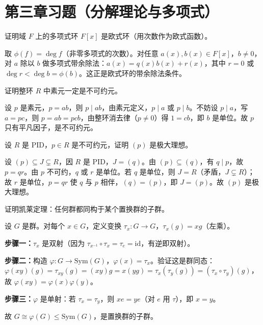 \section{第三章习题（分解理论与多项式）}

\begin{homework}
证明域 $F$ 上的多项式环 $F[x]$ 是欧式环（用次数作为欧式函数）。

\begin{solution}
取 $\phi(f) = \deg f$（非零多项式的次数）。对任意 $a(x), b(x) \in F[x]$，$b \ne 0$，对 $a$ 除以 $b$ 做多项式带余除法：$a(x) = q(x)b(x) + r(x)$，其中 $r = 0$ 或 $\deg r < \deg b = \phi(b)$。这正是欧式环的带余除法条件。
\end{solution}
\end{homework}

\begin{homework}
证明整环 $R$ 中素元一定是不可约元。

\begin{solution}
设 $p$ 是素元，$p = ab$，则 $p \mid ab$，由素元定义，$p \mid a$ 或 $p \mid b$。不妨设 $p \mid a$，写 $a = pc$，则 $p = ab = pcb$，由整环消去律（$p \ne 0$）得 $1 = cb$，即 $b$ 是单位。故 $p$ 只有平凡因子，是不可约元。
\end{solution}
\end{homework}

\begin{homework}
设 $R$ 是 PID，$p \in R$ 是不可约元，证明 $(p)$ 是极大理想。

\begin{solution}
设 $(p) \subseteq J \subsetneq R$，因 $R$ 是 PID，$J = (q)$。由 $(p) \subseteq (q)$，有 $q \mid p$，故 $p = qr$。由 $p$ 不可约，$q$ 或 $r$ 是单位。若 $q$ 是单位，则 $J = R$（矛盾，$J \subsetneq R$）；故 $r$ 是单位，$p = qr$ 使 $q$ 与 $p$ 相伴，$(q) = (p)$，即 $J = (p)$。故 $(p)$ 是极大理想。
\end{solution}
\end{homework}

\begin{homework}
证明凯莱定理：任何群都同构于某个置换群的子群。

\begin{solution}
设 $G$ 是群。对每个 $x \in G$，定义变换 $\tau_x \colon G \to G$，$\tau_x(g) = xg$（左乘）。

\textbf{步骤一：}$\tau_x$ 是双射（因为 $\tau_{x^{-1}} \circ \tau_x = \tau_e = \mathrm{id}$，有逆即双射）。

\textbf{步骤二：}构造 $\varphi \colon G \to \mathrm{Sym}(G)$，$\varphi(x) = \tau_x$。验证这是群同态：$\varphi(xy)(g) = \tau_{xy}(g) = (xy)g = x(yg) = \tau_x(\tau_y(g)) = (\tau_x \circ \tau_y)(g)$，故 $\varphi(xy) = \varphi(x)\varphi(y)$。

\textbf{步骤三：}$\varphi$ 是单射：若 $\tau_x = \tau_y$，则 $xe = ye$（对 $e$ 用 $\tau$），即 $x = y$。

故 $G \cong \varphi(G) \le \mathrm{Sym}(G)$，是置换群的子群。
\end{solution}
\end{homework}


